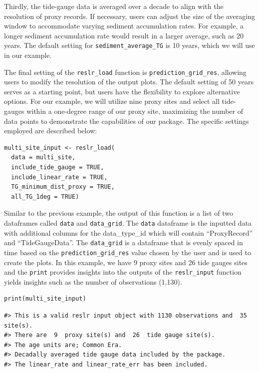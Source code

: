 Thirdly, the tide-gauge data is averaged over a decade to align with the resolution of proxy records. If necessary, users can adjust the size of the averaging window to accommodate varying sediment accumulation rates. For example, a longer sediment accumulation rate would result in a larger average, such as 20 years. The default setting for \texttt{sediment\_average\_TG} is 10 years, which we will use in our example.

The final setting of the \texttt{reslr\_load} function is \texttt{prediction\_grid\_res}, allowing users to modify the resolution of the output plots. The default setting of 50 years serves as a starting point, but users have the flexibility to explore alternative options. For our example, we will utilize nine proxy sites and select all tide-gauges within a one-degree range of our proxy site, maximizing the number of data points to demonstrate the capabilities of our package. The specific settings employed are described below:
\scriptsize

\begin{verbatim}
multi_site_input <- reslr_load(
  data = multi_site,
  include_tide_gauge = TRUE,
  include_linear_rate = TRUE,
  TG_minimum_dist_proxy = TRUE,
  all_TG_1deg = TRUE)
\end{verbatim}

\normalsize

Similar to the previous example, the output of this function is a list of two dataframes called \texttt{data} and \texttt{data\_grid}. The \texttt{data} dataframe is the inputted data with additional columns for the data\_type\_id which will contain ``ProxyRecord'' and ``TideGaugeData''. The \texttt{data\_grid} is a dataframe that is evenly spaced in time based on the \texttt{prediction\_grid\_res} value chosen by the user and is used to create the plots. In this example, we have 9 proxy sites and 26 tide gauges sites and the \texttt{print} provides insights into the outputs of the \texttt{reslr\_input} function yields insights such as the number of observations (1,130).
\scriptsize

\begin{verbatim}
print(multi_site_input)
\end{verbatim}

\begin{verbatim}
#> This is a valid reslr input object with 1130 observations and  35 site(s).
#> There are  9  proxy site(s) and  26  tide gauge site(s).
#> The age units are; Common Era. 
#> Decadally averaged tide gauge data included by the package. 
#> The linear_rate and linear_rate_err has been included.
\end{verbatim}

